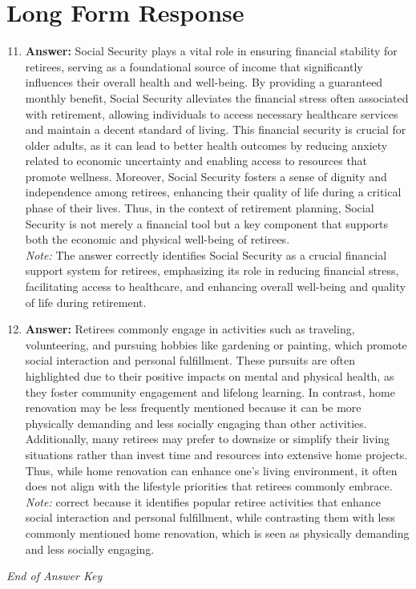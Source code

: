 \documentclass[12pt]{article}
\begin{document}
\section*{Long Form Response}
\begin{enumerate}[label=\arabic*.]
\setcounter{enumi}{10}
\item \textbf{Answer:} Social Security plays a vital role in ensuring financial stability for retirees, serving as a foundational source of income that significantly influences their overall health and well-being. By providing a guaranteed monthly benefit, Social Security alleviates the financial stress often associated with retirement, allowing individuals to access necessary healthcare services and maintain a decent standard of living. This financial security is crucial for older adults, as it can lead to better health outcomes by reducing anxiety related to economic uncertainty and enabling access to resources that promote wellness. Moreover, Social Security fosters a sense of dignity and independence among retirees, enhancing their quality of life during a critical phase of their lives. Thus, in the context of retirement planning, Social Security is not merely a financial tool but a key component that supports both the economic and physical well-being of retirees.
\\ \textit{Note:} The answer correctly identifies Social Security as a crucial financial support system for retirees, emphasizing its role in reducing financial stress, facilitating access to healthcare, and enhancing overall well-being and quality of life during retirement.
\item \textbf{Answer:} Retirees commonly engage in activities such as traveling, volunteering, and pursuing hobbies like gardening or painting, which promote social interaction and personal fulfillment. These pursuits are often highlighted due to their positive impacts on mental and physical health, as they foster community engagement and lifelong learning. In contrast, home renovation may be less frequently mentioned because it can be more physically demanding and less socially engaging than other activities. Additionally, many retirees may prefer to downsize or simplify their living situations rather than invest time and resources into extensive home projects. Thus, while home renovation can enhance one's living environment, it often does not align with the lifestyle priorities that retirees commonly embrace.
\\ \textit{Note:} correct because it identifies popular retiree activities that enhance social interaction and personal fulfillment, while contrasting them with less commonly mentioned home renovation, which is seen as physically demanding and less socially engaging.
\end{enumerate}

\vfill
\noindent\textit{End of Answer Key}
\end{document}
